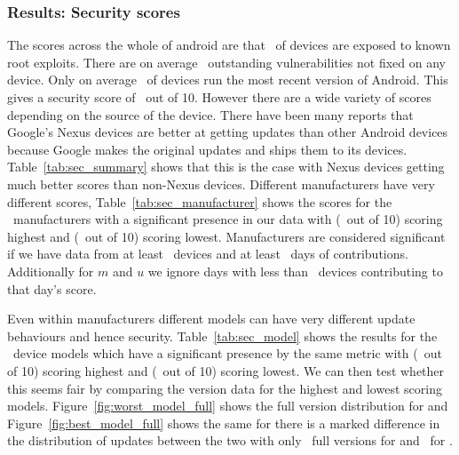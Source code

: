 \subsubsection{Results: Security scores}
The scores across the whole of android are that \daMeanInsecurityPerc\ of devices are exposed to known root exploits.
There are on average \daMeanOutstandingVulnerabilities\ outstanding vulnerabilities not fixed on any device.
Only on average \daUpdatednessPerc\ of devices run the most recent version of Android.
This gives a security score of \daSecurityScore\ out of 10.
\daTabSecScoressummary
However there are a wide variety of scores depending on the source of the device.
There have been many reports that Google's Nexus devices are better at getting updates than other Android devices because Google makes the original updates and ships them to its devices.
Table~\ref{tab:sec_summary} shows that this is the case with Nexus devices getting much better scores than non-Nexus devices.
\daTabSecScoresmanufacturer
Different manufacturers have very different scores, Table~\ref{tab:sec_manufacturer} shows the scores for the \daNumSigManufacturers\ manufacturers with a significant presence in our data with \emph{\daSecScoreBestmanufacturer} (\daSecScoreBestmanufacturerScore\ out of 10) scoring highest and \emph{\daSecScoreWorstmanufacturer} (\daSecScoreWorstmanufacturerScore\ out of 10) scoring lowest.
Manufacturers are considered significant if we have data from at least \daSigNumDevices\ devices and at least \daSigNumDeviceDays\ days of contributions.
Additionally for $m$ and $u$ we ignore days with less than \daSigNumDevicesDay\ devices contributing to that day's score.

\daTabSecScoresmodel
Even within manufacturers different models can have very different update behaviours and hence security.
Table~\ref{tab:sec_model} shows the results for the \daNumSigModels\ device models which have a significant presence by the same metric with \emph{\daSecScoreBestmodel} (\daSecScoreBestmodelScore\ out of 10) scoring highest and \emph{\daSecScoreWorstmodel} (\daSecScoreWorstmodelScore\ out of 10) scoring lowest.
We can then test whether this seems fair by comparing the version data for the highest and lowest scoring models.
Figure~\ref{fig:worst_model_full} shows the full version distribution for \emph{\daSecScoreWorstmodel} and Figure~\ref{fig:best_model_full} shows the same for \emph{\daSecScoreBestmodel} there is a marked difference in the distribution of updates between the two with only \daSecScoreWorstmodelNumFullVersions\ full versions for \emph{\daSecScoreWorstmodel} and \daSecScoreBestmodelNumFullVersions\ for \emph{\daSecScoreBestmodel}.

